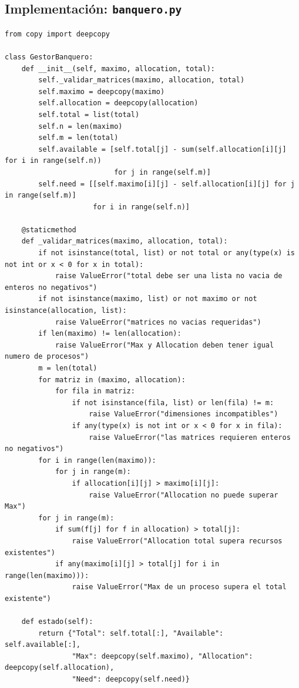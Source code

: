 \documentclass[12pt,a4paper]{article}
\begin{document}
\subsection{Implementación: \texttt{banquero.py}}
\begin{lstlisting}[style=pycode]
from copy import deepcopy

class GestorBanquero:
    def __init__(self, maximo, allocation, total):
        self._validar_matrices(maximo, allocation, total)
        self.maximo = deepcopy(maximo)
        self.allocation = deepcopy(allocation)
        self.total = list(total)
        self.n = len(maximo)
        self.m = len(total)
        self.available = [self.total[j] - sum(self.allocation[i][j] for i in range(self.n))
                          for j in range(self.m)]
        self.need = [[self.maximo[i][j] - self.allocation[i][j] for j in range(self.m)]
                     for i in range(self.n)]

    @staticmethod
    def _validar_matrices(maximo, allocation, total):
        if not isinstance(total, list) or not total or any(type(x) is not int or x < 0 for x in total):
            raise ValueError("total debe ser una lista no vacia de enteros no negativos")
        if not isinstance(maximo, list) or not maximo or not isinstance(allocation, list):
            raise ValueError("matrices no vacias requeridas")
        if len(maximo) != len(allocation):
            raise ValueError("Max y Allocation deben tener igual numero de procesos")
        m = len(total)
        for matriz in (maximo, allocation):
            for fila in matriz:
                if not isinstance(fila, list) or len(fila) != m:
                    raise ValueError("dimensiones incompatibles")
                if any(type(x) is not int or x < 0 for x in fila):
                    raise ValueError("las matrices requieren enteros no negativos")
        for i in range(len(maximo)):
            for j in range(m):
                if allocation[i][j] > maximo[i][j]:
                    raise ValueError("Allocation no puede superar Max")
        for j in range(m):
            if sum(f[j] for f in allocation) > total[j]:
                raise ValueError("Allocation total supera recursos existentes")
            if any(maximo[i][j] > total[j] for i in range(len(maximo))):
                raise ValueError("Max de un proceso supera el total existente")

    def estado(self):
        return {"Total": self.total[:], "Available": self.available[:],
                "Max": deepcopy(self.maximo), "Allocation": deepcopy(self.allocation),
                "Need": deepcopy(self.need)}


\end{lstlisting}
\end{document}
